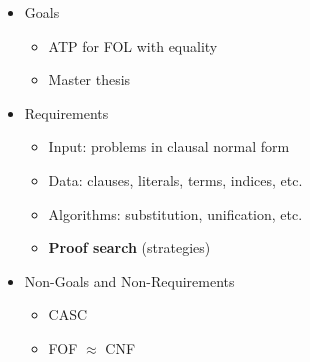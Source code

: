 \begin{itemize}
	\item Goals
	\begin{itemize}
		\item ATP for {FOL} with equality
		\item Master thesis
	\end{itemize}
	\item Requirements
	\begin{itemize}
		\item Input: problems in clausal normal form
		\item Data: clauses, literals, terms, indices, etc.
		\item Algorithms: substitution, unification, etc.
		\item \textbf{Proof search} (strategies)
	\end{itemize}
	\item Non-Goals and Non-Requirements
	\begin{itemize}
		\item CASC
		\item FOF $\approx$ CNF
	\end{itemize}
\end{itemize}